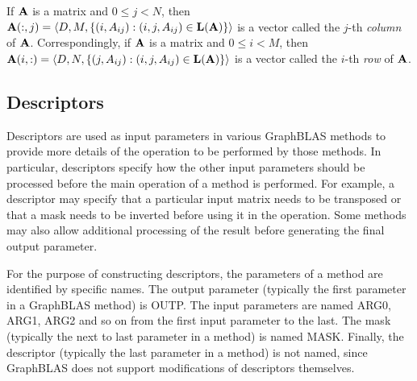 
If ${\bf A}$ is a matrix and $0 \leq j < N$, then ${\bf A}(:,j)
= \langle D, M, \{(i,A_{ij}) : (i,j,A_{ij}) \in \bold{L}({\bf A})
\} \rangle$ is a vector called the $j$-th \emph{column}
of ${\bf A}$. Correspondingly, if ${\bf A}$ is a matrix and
$0 \leq i < M$, then ${\bf A}(i,:) = \langle D, N, \{(j,A_{ij}) :
(i,j,A_{ij}) \in \bold{L}({\bf A}) \} \rangle$ is a vector called
the $i$-th \emph{row} of ${\bf A}$.

\subsection{Descriptors}


Descriptors are used as input parameters in various GraphBLAS methods to
provide more details of the operation to be performed by those methods.
In particular, descriptors specify how the other input parameters
should be processed before the main operation of a method is performed.
For example, a descriptor may specify that a particular input matrix
needs to be transposed or that a mask needs to be inverted before using
it in the operation. Some methods may also allow additional processing
of the result before generating the final output parameter.


For the purpose of constructing descriptors, the parameters of a method
are identified by specific names. The output parameter (typically
the first parameter in a GraphBLAS method) is {\sf OUTP}.  The input
parameters are named {\sf ARG0}, {\sf ARG1}, {\sf ARG2} and so on from
the first input parameter to the last. The mask (typically the next to
last parameter in a method) is named {\sf MASK}. Finally, the descriptor
(typically the last parameter in a method) is not named, since GraphBLAS
does not support modifications of descriptors themselves.




